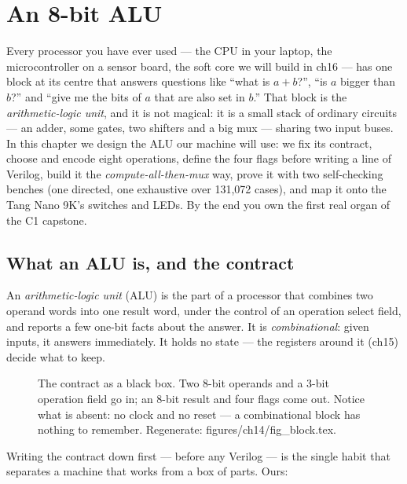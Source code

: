\chapter{An 8-bit ALU}\label{ch:alu8}

Every processor you have ever used --- the CPU in your laptop, the
microcontroller on a sensor board, the soft core we will build in
ch16 --- has one block at its centre that answers questions like
``what is $a+b$?'', ``is $a$ bigger than $b$?'' and ``give me the bits
of $a$ that are also set in $b$.'' That block is the
\emph{arithmetic-logic unit}, and it is not magical: it is a small
stack of ordinary circuits --- an adder, some gates, two shifters and
a big mux --- sharing two input buses. In this chapter we design the
ALU our machine will use: we fix its contract, choose and encode eight
operations, define the four flags before writing a line of Verilog,
build it the \emph{compute-all-then-mux} way, prove it with two
self-checking benches (one directed, one exhaustive over
131{,}072 cases), and map it onto the Tang Nano 9K's switches and
LEDs. By the end you own the first real organ of the C1 capstone.

\section{What an ALU is, and the contract}\label{sec:contract}

An \emph{arithmetic-logic unit} (ALU) is the part of a processor that
combines two operand words into one result word, under the control of
an operation select field, and reports a few one-bit facts about the
answer. It is \emph{combinational}: given inputs, it answers
immediately. It holds no state --- the registers around it (ch15)
decide what to keep.

\begin{figure}[htbp]
\centering

\caption{The contract as a black box. Two 8-bit operands and a 3-bit
operation field go in; an 8-bit result and four flags come out. Notice
what is absent: no clock and no reset --- a combinational block has
nothing to remember. Regenerate: \ttfamily figures/ch14/fig\_block.tex.}
\label{fig:block14}
\end{figure}

Writing the contract down first --- before any Verilog --- is the
single habit that separates a machine that works from a box of parts.
Ours:

